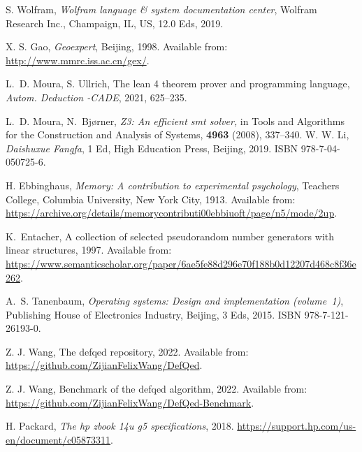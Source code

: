 \documentclass{aims}
\numberwithin{equation}{section}
\numberwithin{theorem}{section}	%
\numberwithin{axiom}{section}	%
\numberwithin{definition}{section}	%
\begin{document}
\begin{thebibliography}{999}

S. Wolfram,
 \emph{Wolfram language \& system documentation center},
 Wolfram Research Inc., Champaign, IL, US, 12.0 Eds, 2019.

X. S. Gao,
 {\it Geoexpert}, Beijing, 1998.
 Available from:
  \url{http://www.mmrc.iss.ac.cn/gex/}.

L.~D. Moura, S. Ullrich,
 The lean 4 theorem prover and programming language,
 \emph{Autom. Deduction -CADE}, 2021, 625--235. 
 
 
L.~D. Moura, N.~Bjørner,
 {\it Z3: An efficient smt solver,}
 in {Tools and Algorithms for the Construction and Analysis of
  Systems}, {\bf 4963} (2008), 337--340.
W. W. Li,
 \emph{Daishuxue Fangfa}, 1 Ed, 
 High Education Press, Beijing, 2019.
 ISBN 978-7-04-050725-6.

H. Ebbinghaus,
 \emph{Memory: A contribution to experimental psychology},
 Teachers College, Columbia University, New York City, 1913.
 Available from:
  \url{https://archive.org/details/memorycontributi00ebbiuoft/page/n5/mode/2up}.

K.~Entacher,
 A collection of selected pseudorandom number generators with linear structures, 1997.
 Available from:
  \url{https://www.semanticscholar.org/paper/6ae5fe88d296e70f188b0d12207d468c8f36e262}.

A.~S. Tanenbaum,
 \emph{Operating systems: Design and implementation (volume~1)}, 
 Publishing House of Electronics Industry, Beijing, 3 Eds, 2015.
 ISBN 978-7-121-26193-0.

Z. J. Wang,
 The defqed repository, 
2022.
 Available from: \url{https://github.com/ZijianFelixWang/DefQed}.

Z. J. Wang,
 Benchmark of the defqed algorithm, 2022.
 Available from: \url{https://github.com/ZijianFelixWang/DefQed-Benchmark}.

H. Packard,
 {\it The hp zbook 14u g5 specifications}, 2018. 
 \url{https://support.hp.com/us-en/document/c05873311}. 


\end{thebibliography}

	
	
\end{document}
